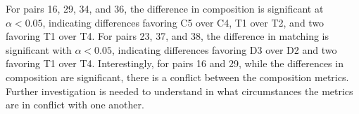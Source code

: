 %
%
%
%
%



 
For pairs 16, 29, 34, and 36, the difference in composition is significant at $\alpha < 0.05$, indicating differences favoring C5 over C4, T1 over T2, and two favoring T1 over T4. 
For pairs 23, 37, and 38, the difference in matching is significant with $\alpha < 0.05$, indicating differences favoring D3 over D2 and two favoring T1 over T4. 
Interestingly, for pairs 16 and 29, while the differences in composition are significant, there is a conflict between the composition metrics. Further investigation is needed to understand in what circumstances the metrics are in conflict with one another. 



